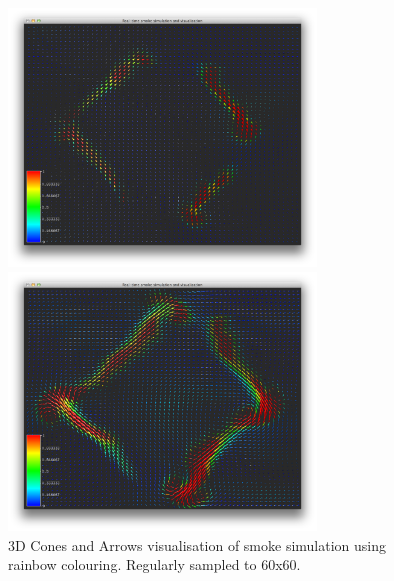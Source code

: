 \begin{figure}[htbp]
\centering
\begin{minipage}[t]{0.48\textwidth}
\includegraphics[height=2.7in]{figures/glyph/d3cones.png}
\end{minipage}
\begin{minipage}[t]{0.48\textwidth}
\includegraphics[height=2.7in]{figures/glyph/d3arrows.png}
\end{minipage}
\caption{3D Cones and Arrows visualisation of smoke simulation using rainbow colouring. Regularly sampled to 60x60.}
\label{fig:d3conesArrows}
\end{figure}



%
%


